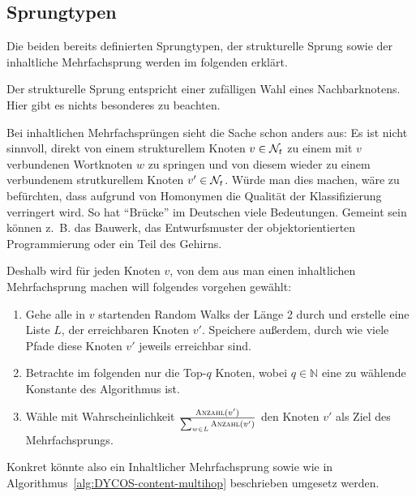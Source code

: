 \subsection{Sprungtypen}
Die beiden bereits definierten Sprungtypen, der strukturelle Sprung
sowie der inhaltliche Mehrfachsprung werden im folgenden erklärt.

Der strukturelle Sprung entspricht einer zufälligen Wahl eines 
Nachbarknotens. Hier gibt es nichts besonderes zu beachten.

Bei inhaltlichen Mehrfachsprüngen sieht die Sache schon anders aus:
Es ist nicht sinnvoll, direkt von einem strukturellem Knoten 
$v \in \mathcal{N}_t$ zu einem mit $v$ verbundenen Wortknoten $w$ zu springen
und von diesem wieder zu einem verbundenem strutkurellem Knoten 
$v' \in \mathcal{N}_t$. Würde man dies machen, wäre zu befürchten, dass
aufgrund von Homonymen die Qualität der Klassifizierung verringert
wird. So hat \enquote{Brücke} im Deutschen viele Bedeutungen.
Gemeint sein können z.~B. das Bauwerk, das Entwurfsmuster der
objektorientierten Programmierung oder ein Teil des Gehirns.

Deshalb wird für jeden Knoten $v$, von dem aus man einen inhaltlichen
Mehrfachsprung machen will folgendes vorgehen gewählt:
\begin{enumerate}
    \item Gehe alle in $v$ startenden Random Walks der Länge 2 durch
          und erstelle eine Liste $L$, der erreichbaren Knoten $v'$. Speichere
          außerdem, durch wie viele Pfade diese Knoten $v'$ jeweils erreichbar sind.
    \item Betrachte im folgenden nur die Top-$q$ Knoten, wobei $q \in \mathbb{N}$
          eine zu wählende Konstante des Algorithmus ist.
    \item Wähle mit Wahrscheinlichkeit $\frac{\Call{Anzahl}{v'}}{\sum_{w \in L} \Call{Anzahl}{v'}}$
          den Knoten $v'$ als Ziel des Mehrfachsprungs.
\end{enumerate}

Konkret könnte also ein Inhaltlicher Mehrfachsprung sowie wie in
Algorithmus~\ref{alg:DYCOS-content-multihop} beschrieben umgesetz werden.

